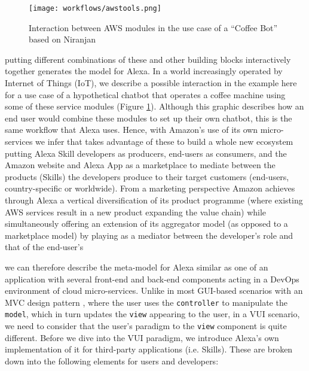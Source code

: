 
\begin{figure}[h!]
	\caption[Interaction Between AWS Modules (Coffee Bot)]{Interaction between AWS modules in the use case of a ``Coffee Bot'' based on Niranjan \cite{aws:lex_webinar} }\label{lex_interactionExample}
	\centering
	\texttt{[image: workflows/awstools.png]}
\end{figure}
%

putting different combinations of these and other building blocks interactively together generates the model for Alexa. In a world increasingly operated by Internet of Things (IoT), we describe a possible interaction in the example here for a use case of a hypothetical chatbot that operates a coffee machine using some of these service modules (Figure \ref{lex_interactionExample}).  Although this graphic describes how an end user would combine these modules to set up their own chatbot, this is the same workflow that Alexa uses. Hence, with Amazon's use of its own micro-services we infer that takes advantage of these to build a whole new ecosystem putting Alexa Skill developers as producers, end-users as consumers, and the Amazon website and Alexa App as a marketplace to mediate between the products (Skills) the developers produce to their target customers (end-users, country-specific or worldwide). From a marketing perspective Amazon achieves through Alexa a vertical diversification of its product programme (where existing AWS services result in a new product expanding the value chain) while simultaneously offering an extension of its aggregator model (as opposed to a marketplace model)%
 by playing as a mediator between the developer's role and that of the end-user's %




we can therefore describe the meta-model for Alexa similar as one %
of an application with several front-end and back-end components acting in a DevOps environment of cloud micro-services. Unlike in most GUI-based scenarios with an MVC design pattern \cite{wiki:mvc}, where the user uses the \texttt{controller} to manipulate the \texttt{model}, which in turn updates the \texttt{view} appearing to the user, in a VUI scenario, we need to consider that the user's paradigm to the \texttt{view} component is quite different. Before we dive into the VUI paradigm, we introduce Alexa's own implementation of it for third-party applications (i.e. Skills). These are broken down into the following elements for users and developers: %



